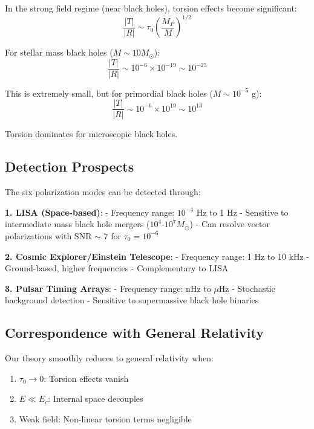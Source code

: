 In the strong field regime (near black holes), torsion effects become significant:
\begin{equation}
    \frac{|T|}{|R|} \sim \tau_0 \left(\frac{M_P}{M}\right)^{1/2}
\end{equation}

For stellar mass black holes ($M \sim 10 M_\odot$):
\begin{equation}
    \frac{|T|}{|R|} \sim 10^{-6} \times 10^{-19} \sim 10^{-25}
\end{equation}

This is extremely small, but for primordial black holes ($M \sim 10^{-5}$ g):
\begin{equation}
    \frac{|T|}{|R|} \sim 10^{-6} \times 10^{19} \sim 10^{13}
\end{equation}

Torsion dominates for microscopic black holes.

\subsection{Detection Prospects}

The six polarization modes can be detected through:

\textbf{1. LISA (Space-based)}:
- Frequency range: $10^{-4}$ Hz to 1 Hz
- Sensitive to intermediate mass black hole mergers ($10^4$-$10^7 M_\odot$)
- Can resolve vector polarizations with SNR $\sim$ 7 for $\tau_0 = 10^{-6}$

\textbf{2. Cosmic Explorer/Einstein Telescope}:
- Frequency range: 1 Hz to 10 kHz
- Ground-based, higher frequencies
- Complementary to LISA

\textbf{3. Pulsar Timing Arrays}:
- Frequency range: nHz to $\mu$Hz
- Stochastic background detection
- Sensitive to supermassive black hole binaries

\subsection{Correspondence with General Relativity}

Our theory smoothly reduces to general relativity when:
\begin{enumerate}
    \item $\tau_0 \to 0$: Torsion effects vanish
    \item $E \ll E_c$: Internal space decouples
    \item Weak field: Non-linear torsion terms negligible
\end{enumerate}

